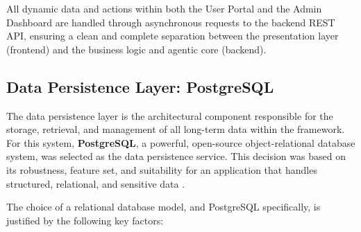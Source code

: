 All dynamic data and actions within both the User Portal and the Admin Dashboard are handled through asynchronous requests to the backend REST API, ensuring a clean and complete separation between the presentation layer (frontend) and the business logic and agentic core (backend).

\subsection{Data Persistence Layer: PostgreSQL}

The data persistence layer is the architectural component responsible for the storage, retrieval, and management of all long-term data within the framework. For this system, \textbf{PostgreSQL}, a powerful, open-source object-relational database system, was selected as the data persistence service. This decision was based on its robustness, feature set, and suitability for an application that handles structured, relational, and sensitive data \cite{stonebraker2018postgresql, juba2021postgresql}.

The choice of a relational database model, and PostgreSQL specifically, is justified by the following key factors:

